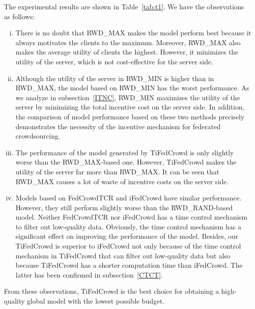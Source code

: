 \documentclass[final,1p,times]{elsarticle}
\begin{document}
The experimental results are shown in Table~\ref{tab:t1}. We have the observations as follows:
\begin{enumerate}[(i)]
	\item There is no doubt that RWD\_MAX makes the model perform best because it always motivates the clients to the maximum. Moreover, RWD\_MAX also makes the average utility of clients the highest. However, it minimizes the utility of the server, which is not cost-effective for the server side.
	\item Although the utility of the server in RWD\_MIN is higher than in RWD\_MAX, the model based on RWD\_MIN has the worst performance. As we analyze in subsection~\ref{ITNC}, RWD\_MIN maximizes the utility of the server by minimizing the total incentive cost on the server side. In addition, the comparison of model performance based on these two methods precisely demonstrates the necessity of the incentive mechanism for federated crowdsourcing.
	\item The performance of the model generated by TiFedCrowd is only slightly worse than the RWD\_MAX-based one. However, TiFedCrowd makes the utility of the server far more than RWD\_MAX. It can be seen that RWD\_MAX causes a lot of waste of incentive costs on the server side.
	\item Models based on FedCrowdTCR and iFedCrowd \citep{kang2022incentive} have similar performance. However, they still perform slightly worse than the RWD\_RAND-based model. Neither FedCrowdTCR nor iFedCrowd has a time control mechanism to filter out low-quality data. Obviously, the time control mechanism has a significant effect on improving the performance of the model. Besides, our TiFedCrowd is superior to iFedCrowd not only because of the time control mechanism in TiFedCrowd that can filter out low-quality data but also because TiFedCrowd has a shorter computation time than iFedCrowd. The latter has been confirmed in subsection~\ref{CTCT}.
\end{enumerate}

From these observations, TiFedCrowd is the best choice for obtaining a high-quality global model with the lowest possible budget.
\end{document}
